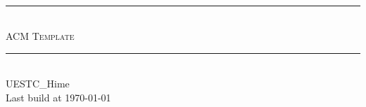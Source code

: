 \begin{titlepage}
	\pagestyle{empty}
	
  \begin{center}
		~\\[80pt]
    \hrule\ \\[8pt]
    \fontsize{48pt}{\baselineskip}\selectfont  \textsc{ACM Template}\\[8pt]
    \hrule\ \\[250pt]

    \huge UESTC\_Hime\\[8pt]
    \Large Last build at \today
  \end{center}
\end{titlepage}
\restoregeometry
